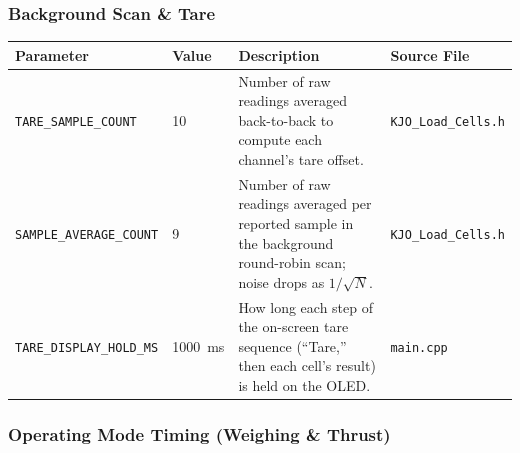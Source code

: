 ﻿\documentclass[11pt,letterpaper]{article}
\begin{document}
\subsubsection*{Background Scan \& Tare}

\begingroup
\footnotesize
\begin{longtable}{@{}p{3.2cm}p{2.4cm}p{6.2cm}p{2.6cm}@{}}
\toprule
Parameter & Value & Description & Source File \\
\midrule
\texttt{TARE\_\allowbreak SAMPLE\_\allowbreak COUNT} & 10 & Number of raw readings averaged back-to-back to compute each channel's tare offset. & \texttt{KJO\_\allowbreak Load\_\allowbreak Cells.h} \\
\texttt{SAMPLE\_\allowbreak AVERAGE\_\allowbreak COUNT} & 9 & Number of raw readings averaged per reported sample in the background round-robin scan; noise drops as $1/\sqrt{N}$. & \texttt{KJO\_\allowbreak Load\_\allowbreak Cells.h} \\
\texttt{TARE\_\allowbreak DISPLAY\_\allowbreak HOLD\_\allowbreak MS} & 1000~ms & How long each step of the on-screen tare sequence (``Tare,'' then each cell's result) is held on the OLED. & \texttt{main.cpp} \\
\end{longtable}
\endgroup

\subsubsection*{Operating Mode Timing (Weighing \& Thrust)}
\end{document}
